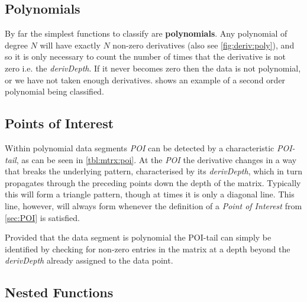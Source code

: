 \documentclass[main.tex]{subfiles}
\begin{document}
    \subsection{Polynomials}
    
      By far the simplest functions to classify are \textbf{polynomials}. Any polynomial of degree $N$ will have exactly $N$ non-zero derivatives (also see \cref{fig:deriv:poly}), and so it is only necessary to count the number of times that the derivative is not zero i.e. the \textit{derivDepth}. If it never becomes zero then the data is not polynomial, or we have not taken enough derivatives.  shows an example of a second order polynomial being classified.
      
    \subsection{Points of Interest}
      
      Within polynomial data segments \textit{POI} can be detected by a characteristic \textit{POI-tail}, as can be seen in \cref{tbl:mtrx:poi}. At the \textit{POI} the derivative changes in a way that breaks the underlying pattern, characterised by its \textit{derivDepth}, which in turn propagates through the preceding points down the depth of the matrix. Typically this will form a triangle pattern, though at times it is only a diagonal line. This line, however, will always form whenever the definition of a \textit{Point of Interest} from \cref{sec:POI} is satisfied.
      
          
      
      Provided that the data segment is polynomial the POI-tail can simply be identified by checking for non-zero entries in the matrix at a depth beyond the \textit{derivDepth} already assigned to the data point. 
    
    \subsection{Nested Functions}
      \label{sec:con:nest}
      
\end{document}
